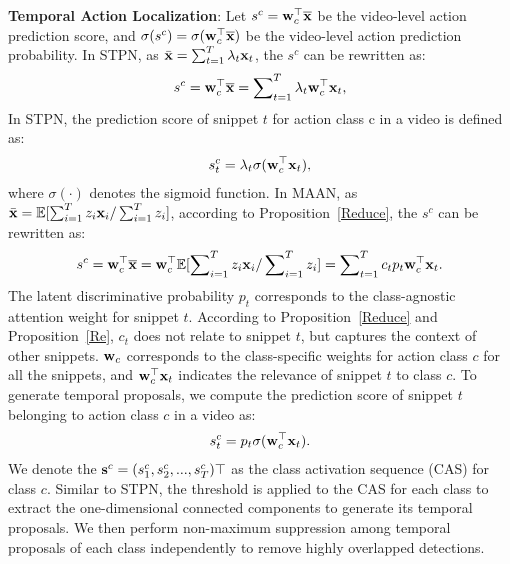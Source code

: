 \documentclass{article} \usepackage{iclr2019_conference,times}
\begin{document}
\textbf{Temporal Action Localization}:
Let $s^c = {\bf{w}}_c^\top \overline{{\bf{x}}}$ be the video-level action prediction score, and $ \sigma( s^c) = \sigma({\bf{w}}_c^\top \overline{{\bf{x}}}) $ be the video-level action prediction probability. In STPN, as $\bar {\bf{x}} = \sum\nolimits_{t = 1}^T {{\lambda_t}{{\bf{x}}_t}}$,  the $s^c$ can be rewritten as:
\begin{align}
\label{sc}
   s^c  =  {\bf{w}}_c^\top \overline{\bf{x}}
    = \sum\nolimits_{t = 1}^T {{\lambda_t}{\bf{w}}_c^ \top {{\bf{x}}_t}},
 \end{align}
In STPN, the prediction score of snippet $t$ for action class c in a video is defined as:  
\begin{align}
\label{sct}
    s^c_t = {{\lambda_t}  \sigma( {\bf{w}}_c^ \top  {{\bf{x}}_t}}),
\end{align}
where $\sigma(\cdot)$ denotes the sigmoid function. In MAAN, as $\bar {\bf{x}} = \mathbb{E}[{\sum\nolimits_{i = 1}^T {{z_i}} {{\bf{x}}_i}}/\sum\nolimits_{i=1}^T{{z_i}}]$, according to Proposition~\ref{Reduce}, the $s^c$ can be rewritten as: \begin{align}
\label{sc}
   s^c  =  {\bf{w}}_c^\top \overline{\bf{x}} = {\bf{w}}_c^\top {\mathbb{E}[{\sum\nolimits_{i = 1}^T {{z_i}} {{\bf{x}}_i}}/\sum\nolimits_{i=1}^T{{z_i}}]}
    = \sum\nolimits_{t = 1}^T {{c_t}{p_t}{\bf{w}}_c^ \top {{\bf{x}}_t}}.
 \end{align}
The latent discriminative probability $p_t$ corresponds to the class-agnostic attention weight for snippet $ t $. According to Proposition~\ref{Reduce} and Proposition~\ref{Re}, $c_t$ does not relate to snippet $ t $, but captures the context of other snippets. $ {\bf{w}}_c $ corresponds to the class-specific weights for action class $ c $ for all the snippets, and $ {\bf{w}}_c^ \top {{\bf{x}}_t}$ indicates the relevance of snippet $ t $ to class $ c $. To generate temporal proposals, we compute the prediction score of snippet $ t $ belonging to action class $ c $ in a video as:
\begin{align}
\label{MAANscore}
    s^c_t = {{p_t} \sigma ( {\bf{w}}_c^ \top {{\bf{x}}_t}) }.
\end{align}
We denote the $ {\bf{s}}^{c} = (s^c_1, s^c_2, ..., s^c_T) \top $ as the class activation sequence (CAS) for class $ c $. Similar to STPN, the threshold is applied to the CAS for each class to extract the one-dimensional connected components to generate its temporal proposals. We then perform non-maximum suppression among temporal proposals of each class independently to remove highly overlapped detections.
\end{document}
